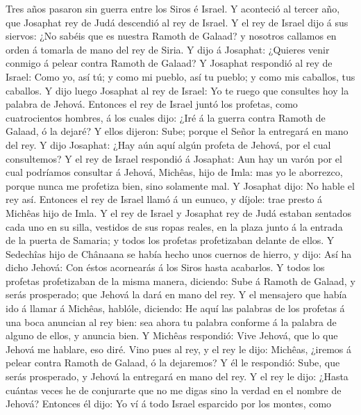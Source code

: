  Tres años pasaron sin guerra entre los Siros é Israel.
 Y aconteció al tercer año, que Josaphat rey de Judá
descendió al rey de Israel.  Y el rey de Israel dijo á sus
siervos: ¿No sabéis que es nuestra Ramoth de Galaad? y nosotros callamos
en orden á tomarla de mano del rey de Siria.  Y dijo á
Josaphat: ¿Quieres venir conmigo á pelear contra Ramoth de Galaad? Y
Josaphat respondió al rey de Israel: Como yo, así tú; y como mi pueblo,
así tu pueblo; y como mis caballos, tus caballos.  Y dijo
luego Josaphat al rey de Israel: Yo te ruego que consultes hoy la
palabra de Jehová.  Entonces el rey de Israel juntó los
profetas, como cuatrocientos hombres, á los cuales dijo: ¿Iré á la
guerra contra Ramoth de Galaad, ó la dejaré? Y ellos dijeron: Sube;
porque el Señor la entregará en mano del rey.  Y dijo
Josaphat: ¿Hay aún aquí algún profeta de Jehová, por el cual
consultemos?  Y el rey de Israel respondió á Josaphat: Aun
hay un varón por el cual podríamos consultar á Jehová, Michêas, hijo de
Imla: mas yo le aborrezco, porque nunca me profetiza bien, sino
solamente mal. Y Josaphat dijo: No hable el rey así. 
Entonces el rey de Israel llamó á un eunuco, y díjole: trae presto á
Michêas hijo de Imla.  Y el rey de Israel y Josaphat rey
de Judá estaban sentados cada uno en su silla, vestidos de sus ropas
reales, en la plaza junto á la entrada de la puerta de Samaria; y todos
los profetas profetizaban delante de ellos.  Y Sedechîas
hijo de Chânaana se había hecho unos cuernos de hierro, y dijo: Así ha
dicho Jehová: Con éstos acornearás á los Siros hasta acabarlos.
 Y todos los profetas profetizaban de la misma manera,
diciendo: Sube á Ramoth de Galaad, y serás prosperado; que Jehová la
dará en mano del rey.  Y el mensajero que había ido á
llamar á Michêas, hablóle, diciendo: He aquí las palabras de los
profetas á una boca anuncian al rey bien: sea ahora tu palabra conforme
á la palabra de alguno de ellos, y anuncia bien.  Y
Michêas respondió: Vive Jehová, que lo que Jehová me hablare, eso diré.
 Vino pues al rey, y el rey le dijo: Michêas, ¿iremos á
pelear contra Ramoth de Galaad, ó la dejaremos? Y él le respondió: Sube,
que serás prosperado, y Jehová la entregará en mano del rey.
 Y el rey le dijo: ¿Hasta cuántas veces he de conjurarte
que no me digas sino la verdad en el nombre de Jehová? 
Entonces él dijo: Yo ví á todo Israel esparcido por los montes, como
